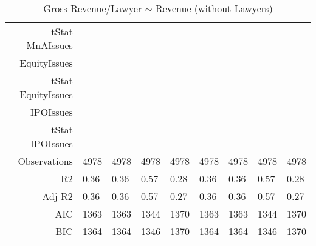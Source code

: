 \begin{table}[ht]
\begin{tabular}{rllllllll}
  tStat MnAIssues &  &  &  &  &  &  &  &  \\ 
  EquityIssues &  &  &  &  &  &  &  &  \\ 
  tStat EquityIssues &  &  &  &  &  &  &  &  \\ 
  IPOIssues &  &  &  &  &  &  &  &  \\ 
  tStat IPOIssues &  &  &  &  &  &  &  &  \\ 
  Observations & 4978 & 4978 & 4978 & 4978 & 4978 & 4978 & 4978 & 4978 \\ 
  R2 & 0.36 & 0.36 & 0.57 & 0.28 & 0.36 & 0.36 & 0.57 & 0.28 \\ 
  Adj R2 & 0.36 & 0.36 & 0.57 & 0.27 & 0.36 & 0.36 & 0.57 & 0.27 \\ 
  AIC & 1363 & 1363 & 1344 & 1370 & 1363 & 1363 & 1344 & 1370 \\ 
  BIC & 1364 & 1364 & 1346 & 1370 & 1364 & 1364 & 1346 & 1370 \\ 
   \hline
\end{tabular}
\caption{Gross Revenue/Lawyer $\sim$ Revenue (without Lawyers)} 
\end{table}
